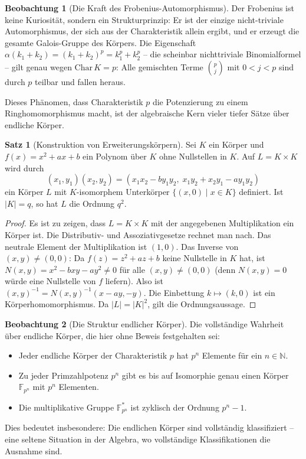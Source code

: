 ﻿\documentclass[a4paper,12pt]{report}
\theoremstyle{definition}
\newtheorem{satz}{Satz}
\newtheorem{beobachtung}{Beobachtung}
\begin{document}
\begin{beobachtung}[Die Kraft des Frobenius-Automorphismus]
    Der Frobenius ist keine Kuriosität, sondern ein Strukturprinzip:
    Er ist der einzige nicht-triviale Automorphismus, der sich aus der
    Charakteristik allein ergibt, und er erzeugt die gesamte Galois-Gruppe
    des Körpers. Die Eigenschaft $\alpha(k_1 + k_2) = (k_1 + k_2)^p =
    k_1^p + k_2^p$ -- die scheinbar nichttriviale Binomialformel -- gilt
    genau wegen $\mathrm{Char}\, K = p$: Alle gemischten Terme
    $\binom{p}{j}$ mit $0 < j < p$ sind durch $p$ teilbar und fallen heraus.

    Dieses Phänomen, dass Charakteristik $p$ die Potenzierung zu einem
    Ringhomomorphismus macht, ist der algebraische Kern vieler tiefer
    Sätze über endliche Körper.
\end{beobachtung}

\begin{satz}[Konstruktion von Erweiterungskörpern]
    Sei $K$ ein Körper und $f(x) = x^2 + ax + b$ ein Polynom über $K$
    ohne Nullstellen in $K$. Auf $L = K \times K$ wird durch
    \[
        (x_1, y_1)(x_2, y_2) = (x_1 x_2 - b y_1 y_2,\; x_1 y_2 + x_2 y_1 - a y_1 y_2)
    \]
    ein Körper $L$ mit $K$-isomorphem Unterkörper $\{(x, 0) \mid x \in K\}$
    definiert. Ist $|K| = q$, so hat $L$ die Ordnung $q^2$.
\end{satz}
\begin{proof}
    Es ist zu zeigen, dass $L = K \times K$ mit der angegebenen Multiplikation
    ein Körper ist. Die Distributiv- und Assoziativgesetze rechnet man nach.
    Das neutrale Element der Multiplikation ist $(1, 0)$.
    Das Inverse von $(x, y) \neq (0, 0)$: Da $f(z) = z^2 + az + b$ keine
    Nullstelle in $K$ hat, ist $N(x,y) = x^2 - bxy - ay^2 \neq 0$ für alle
    $(x,y) \neq (0,0)$ (denn $N(x,y) = 0$ würde eine Nullstelle von $f$ liefern).
    Also ist $(x,y)^{-1} = N(x,y)^{-1}(x - ay, -y)$.
    Die Einbettung $k \mapsto (k,0)$ ist ein Körperhomomorphismus.
    Da $|L| = |K|^2$, gilt die Ordnungsaussage.
\end{proof}


\begin{beobachtung}[Die Struktur endlicher Körper]
    Die vollständige Wahrheit über endliche Körper, die hier ohne Beweis
    festgehalten sei:
    \begin{itemize}
        \item[-] Jeder endliche Körper der Charakteristik $p$ hat $p^n$ Elemente
              für ein $n \in \mathbb{N}$.
        \item[-] Zu jeder Primzahlpotenz $p^n$ gibt es bis auf Isomorphie genau
              einen Körper $\mathbb{F}_{p^n}$ mit $p^n$ Elementen.
        \item[-] Die multiplikative Gruppe $\mathbb{F}_{p^n}^*$ ist zyklisch der
              Ordnung $p^n - 1$.
    \end{itemize}
    Dies bedeutet insbesondere: Die endlichen Körper sind vollständig
    klassifiziert -- eine seltene Situation in der Algebra, wo vollständige
    Klassifikationen die Ausnahme sind.
\end{beobachtung}
\end{document}

